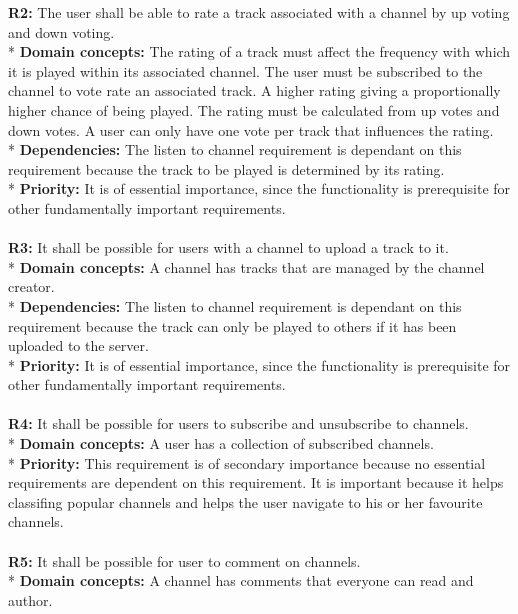 \documentclass[a4paper,11pt,report]{article}
\begin{document}
\textbf{R2:}
The user shall be able to rate a track associated with a channel by up voting and down voting. \\*
\textbf{Domain concepts:}
The rating of a track must affect the frequency with which it is played within its associated channel. The user must be subscribed to the channel to vote rate an associated track.
A higher rating giving a proportionally higher chance of being played. The rating must be calculated from up votes and down votes. A user can only have one vote per track that influences the rating. \\*
\textbf{Dependencies:}
The listen to channel requirement is dependant on this requirement because the track to be played is determined by its rating.\\*
\textbf{Priority:}
It is of essential importance, since the functionality is prerequisite for other fundamentally important requirements.
\\ \\

\textbf{R3:}
It shall be possible for users with a channel to upload a track to it. \\*
\textbf{Domain concepts:}
A channel has tracks that are managed by the channel creator. \\*
\textbf{Dependencies:}
The listen to channel requirement is dependant on this requirement because the track can only be played to others if it has been uploaded to the server.\\*
\textbf{Priority:}
It is of essential importance, since the functionality is prerequisite for other fundamentally important requirements.
\\ \\

\textbf{R4:}
It shall be possible for users to subscribe and unsubscribe to channels. \\*
\textbf{Domain concepts:}
A user has a collection of subscribed channels. \\*
\textbf{Priority:}
This requirement is of secondary importance because no essential requirements are dependent on this requirement. It is important because it helps classifing popular channels and helps the user navigate to his or her favourite channels.
\\ \\

\textbf{R5:}
It shall be possible for user to comment on channels. \\*
\textbf{Domain concepts:}
A channel has comments that everyone can read and author.
\\ \\
\end{document}

